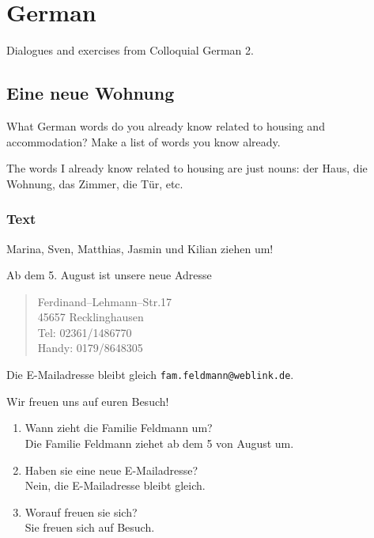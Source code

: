 \chapter{German}
Dialogues and exercises from Colloquial German 2.

\section{Eine neue Wohnung}
\begin{exercise}
  What German words do you already know related to housing and
  accommodation? Make a list of words you know already.

  The words I already know related to housing are just nouns: der Haus, die
  Wohnung, das Zimmer, die Tür, etc.
\end{exercise}

\subsection{Text}
Marina, Sven, Matthias, Jasmin und Kilian ziehen um!

Ab dem 5. August ist unsere neue Adresse
\begin{quote}
  Ferdinand--Lehmann--Str.\@ 17\\
  45657 Recklinghausen\\
  Tel: 02361/1486770\\
  Handy: 0179/8648305
\end{quote}
Die E-Mailadresse bleibt gleich \texttt{fam.feldmann@weblink.de}.

Wir freuen uns auf euren Besuch!

\begin{exercise}
  \hfill
  \begin{enumerate}[label=\arabic*.]
  \item Wann zieht die Familie Feldmann um?\\
    Die Familie Feldmann ziehet ab dem 5 von August um.
  \item Haben sie eine neue E-Mailadresse?\\
    Nein, die E-Mailadresse bleibt gleich.
  \item Worauf freuen sie sich?\\
    Sie freuen sich auf Besuch.
  \end{enumerate}
\end{exercise}

